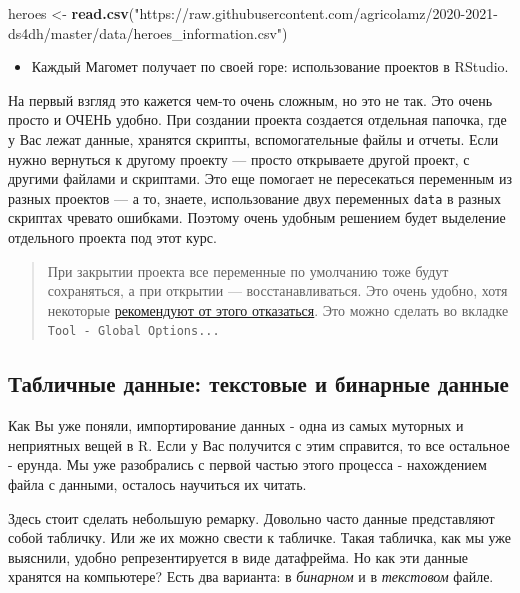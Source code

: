 \documentclass[]{book}
\newenvironment{Shaded}{\begin{snugshade}}{\end{snugshade}}
\newcommand{\KeywordTok}[1]{\textcolor[rgb]{0.13,0.29,0.53}{\textbf{#1}}}
\newcommand{\StringTok}[1]{\textcolor[rgb]{0.31,0.60,0.02}{#1}}
\newcommand{\NormalTok}[1]{#1}
\providecommand{\tightlist}{%
  \setlength{\itemsep}{0pt}\setlength{\parskip}{0pt}}
\begin{document}
\begin{Shaded}
\begin{Highlighting}[]
\NormalTok{heroes <-}\StringTok{ }\KeywordTok{read.csv}\NormalTok{(}\StringTok{"https://raw.githubusercontent.com/agricolamz/2020-2021-ds4dh/master/data/heroes_information.csv"}\NormalTok{)}
\end{Highlighting}
\end{Shaded}

\begin{itemize}
\tightlist
\item
  Каждый Магомет получает по своей горе: использование проектов в
  RStudio.
\end{itemize}

На первый взгляд это кажется чем-то очень сложным, но это не так. Это
очень просто и ОЧЕНЬ удобно. При создании проекта создается отдельная
папочка, где у Вас лежат данные, хранятся скрипты, вспомогательные файлы
и отчеты. Если нужно вернуться к другому проекту --- просто открываете
другой проект, с другими файлами и скриптами. Это еще помогает не
пересекаться переменным из разных проектов --- а то, знаете,
использование двух переменных \texttt{data} в разных скриптах чревато
ошибками. Поэтому очень удобным решением будет выделение отдельного
проекта под этот курс.

\begin{quote}
При закрытии проекта все переменные по умолчанию тоже будут сохраняться,
а при открытии --- восстанавливаться. Это очень удобно, хотя некоторые
\href{https://r4ds.had.co.nz/workflow-projects.html}{рекомендуют от
этого отказаться}. Это можно сделать во вкладке
\texttt{Tool\ -\ Global\ Options...}
\end{quote}

\subsection{Табличные данные: текстовые и бинарные
данные}\label{text_binary}

Как Вы уже поняли, импортирование данных - одна из самых муторных и
неприятных вещей в R. Если у Вас получится с этим справится, то все
остальное - ерунда. Мы уже разобрались с первой частью этого процесса -
нахождением файла с данными, осталось научиться их читать.

Здесь стоит сделать небольшую ремарку. Довольно часто данные
представляют собой табличку. Или же их можно свести к табличке. Такая
табличка, как мы уже выяснили, удобно репрезентируется в виде
датафрейма. Но как эти данные хранятся на компьютере? Есть два варианта:
в \emph{бинарном} и в \emph{текстовом} файле.
\end{document}
